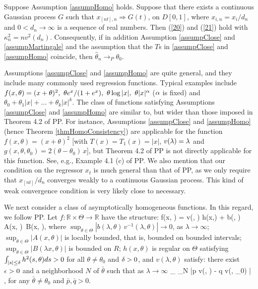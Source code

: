 \begin{thm}  Suppose Assumption \ref{assumpHomo} holds. Suppose that there exists a continuous Gaussian process $G$ such that $x_{[nt], n} \Rightarrow G(t)$, on $D[0,1]$, where $x_{i,n} = x_i / d_n$  and $0 < d_n \to \infty$ is a sequence of real numbers.
Then (\ref {20}) and (\ref {21}) hold with $\kappa^2_n=nv^2(d_n)$. Consequently,
if in addition Assumption \ref{assumpClose} and \ref{assumpMartingale} and the assumption that the $T$s in \ref{assumpClose} and \ref{assumpHomo} coincide, then $\hat{\theta}_n \rightarrow_P \theta_0$.
\end{thm}


Assumptions \ref{assumpClose} and \ref{assumpHomo} are quite general, and they include many commonly used regression functions. Typical examples include $f(x, \theta)=(x+\theta)^2,\ \theta e^{x}/(1 + e^x),\ \theta \log |x|,\ \theta |x|^\alpha$ ($\alpha$ is fixed) and $\theta_0+\theta_1 |x|+...+\theta_k|x|^k$.
The class of functions satisfying Assumptions \ref{assumpClose} and \ref{assumpHomo} are similar to, but wider than those imposed in Theorem 4.2 of PP. For instance,   Assumptions \ref{assumpClose} and \ref{assumpHomo} (hence Theorem \ref{thmHomoConsistency}) are applicable for   the function $f(x, \theta)=(x+\theta)^2$  [with $T(x)= T_1(x)=|x|$, $v(\lambda)=\lambda$ and $g(x, \theta, \theta_0)=2(\theta-\theta_0)\, x$], but Theorem 4.2 of PP is not  directly applicable for this function. See, e.g., Example 4.1 (c) of PP. We also mention that our condition on the regressor $x_t$ is much general than that of PP, as we only require that $x_{[nt]} / d_n$ converges weakly to a continuous Gaussian  process. This kind of weak convergence condition is very likely close to necessary.

\medskip
We next consider  a class of asymptotically homogeneous functions. In this regard, we follow PP. Let $f:\mathbb{R} \times \Theta \rightarrow \mathbb{R} $ have the structure:
 \be
 f(\lambda x, \theta) = v(\lambda, \theta) h(x,\theta) + b(\lambda, \theta)\, A(x, \theta)\, B(\lambda x, \theta), 
 \ee
 where $\sup_{\theta\in \Theta}|b(\lambda, \theta)\, v^{-1}(\lambda, \theta)|\to 0$, as $\lambda\to \infty$; $\sup_{\theta\in \Theta}|A(x, \theta)|$ is locally bounded, that is, bounded on bounded intervals;
 $\sup_{\theta\in \Theta} |B(\lambda x, \theta)|$ is bounded on $R$; $h(x, \theta)$ is regular on $\Theta$ satisfying $\int_{|s| \le \delta} h^2(s, \theta)  ds > 0$   for all $\theta \ne \theta_0$ and $\delta > 0$,  and $v(\lambda, \theta)$ satisfy:   there exist $\epsilon > 0$ and a neighborhood $N$ of $\bar{\theta}$ such that as $\lambda \to \infty$
\be
\inf_{} \inf_{\theta \in N} |p v(\lambda, \theta) - q v(\lambda, \theta_0) | \to \infty,
\ee
for any $\bar{\theta} \ne \theta_0$ and $\bar{p}, \bar{q} > 0$.


